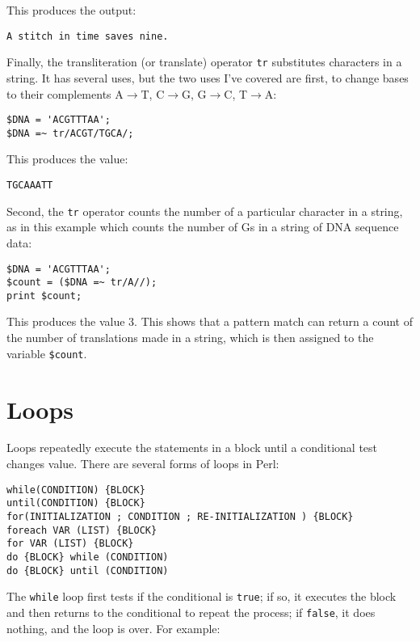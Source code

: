 This produces the output:

\begin{lstlisting}
A stitch in time saves nine.
\end{lstlisting}

Finally, the transliteration (or translate) operator \verb|tr| substitutes characters in a string. It has several uses, but the two uses I've covered are first, to change bases to their complements A$\rightarrow$T, C$\rightarrow$G, G$\rightarrow$C, T$\rightarrow$A:

\begin{lstlisting}
$DNA = 'ACGTTTAA';
$DNA =~ tr/ACGT/TGCA/;
\end{lstlisting}

This produces the value:

\begin{lstlisting}
TGCAAATT
\end{lstlisting}

Second, the \verb|tr| operator counts the number of a particular character in a string, as in this example which counts the number of Gs in a string of DNA sequence data:

\begin{lstlisting}
$DNA = 'ACGTTTAA';
$count = ($DNA =~ tr/A//);
print $count;
\end{lstlisting}

This produces the value 3. This shows that a pattern match can return a count of the number of translations made in a string, which is then assigned to the variable \verb|$count|.

\section{Loops}
Loops repeatedly execute the statements in a block until a conditional test changes value. There are several forms of loops in Perl:

\begin{lstlisting}
while(CONDITION) {BLOCK}
until(CONDITION) {BLOCK}
for(INITIALIZATION ; CONDITION ; RE-INITIALIZATION ) {BLOCK}
foreach VAR (LIST) {BLOCK}
for VAR (LIST) {BLOCK}
do {BLOCK} while (CONDITION)
do {BLOCK} until (CONDITION)
\end{lstlisting}

The \verb|while| loop first tests if the conditional is \verb|true|; if so, it executes the block and then returns to the conditional to repeat the process; if \verb|false|, it does nothing, and the loop is over. For example:

